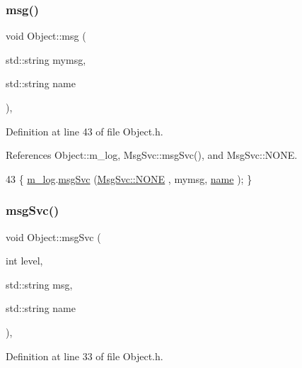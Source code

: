 \subsubsection{\texorpdfstring{msg()}{msg()}\hspace{0.1cm}{\footnotesize\ttfamily [2/2]}}
{\footnotesize\ttfamily void Object\+::msg (\begin{DoxyParamCaption}\item[{std\+::string}]{mymsg,  }\item[{std\+::string}]{name }\end{DoxyParamCaption})\hspace{0.3cm}{\ttfamily [inline]}, {\ttfamily [inherited]}}



Definition at line 43 of file Object.\+h.



References Object\+::m\+\_\+log, Msg\+Svc\+::msg\+Svc(), and Msg\+Svc\+::\+N\+O\+NE.


\begin{DoxyCode}
43 \{ \hyperlink{classObject_a0d269813dd7ac1f24bc143031e2963f2}{m\_log}.\hyperlink{classMsgSvc_ad25f18047920cc59a314e5098259711c}{msgSvc} (\hyperlink{classMsgSvc_ae671eb7301996cd049d2da8a65925926a9be9ae32fed8e1e6eba4a58692210fbd}{MsgSvc::NONE}    , mymsg, \hyperlink{classObject_a300f4c05dd468c7bb8b3c968868443c1}{name} ); \}
\end{DoxyCode}
\mbox{\label{classObject_a3f9d5537ebce0c0f2bf6ae4d92426f3c}} 
\subsubsection{\texorpdfstring{msg\+Svc()}{msgSvc()}}
{\footnotesize\ttfamily void Object\+::msg\+Svc (\begin{DoxyParamCaption}\item[{int}]{level,  }\item[{std\+::string}]{msg,  }\item[{std\+::string}]{name }\end{DoxyParamCaption})\hspace{0.3cm}{\ttfamily [inline]}, {\ttfamily [inherited]}}



Definition at line 33 of file Object.\+h.



